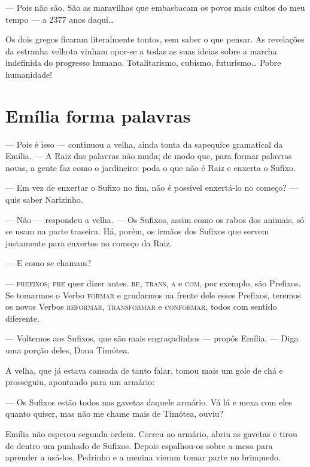 --- Pois não são. São as maravilhas que embasbacam os povos mais cultos
do meu tempo --- a 2377 anos daqui\ldots{}

Os dois gregos ficaram literalmente tontos, sem saber o que pensar. As
revelações da estranha velhota vinham opor-se a todas as suas ideias
sobre a marcha indefinida do progresso humano. Totalitarismo, cubismo,
futurismo\ldots{} Pobre humanidade!


\chapter{Emília forma palavras}

--- Pois é isso --- continuou a velha, ainda tonta da sapequice
gramatical da Emília. --- A Raiz das palavras não muda; de modo que,
para formar palavras novas, a gente faz como o jardineiro: poda o que
não é Raiz e enxerta o Sufixo.

--- Em vez de enxertar o Sufixo no fim, não é possível enxertá-lo no
começo? --- quis saber Narizinho.

--- Não --- respondeu a velha. --- Os Sufixos, assim como os rabos dos
animais, só se usam na parte traseira. Há, porém, os irmãos dos Sufixos
que servem justamente para enxertos no começo da Raiz.

--- E como se chamam?

--- \textsc{prefixos}; \textsc{pre} quer dizer antes. \textsc{re}, \textsc{trans}, \textsc{a} e \textsc{com}, por exemplo, são
Prefixos. Se tomarmos o Verbo \textsc{formar} e grudarmos na frente dele esses
Prefixos, teremos os novos Verbos \textsc{reformar}, \textsc{transformar} e \textsc{conformar},
todos com sentido diferente.

--- Voltemos aos Sufixos, que são mais engraçadinhos --- propôs Emília.
--- Diga uma porção deles, Dona Timótea.

A velha, que já estava cansada de tanto falar, tomou mais um gole de chá
e prosseguiu, apontando para um armário:

--- Os Sufixos estão todos nas gavetas daquele armário. Vá lá e mexa com
eles quanto quiser, mas não me chame mais de Timótea, ouviu?

Emília não esperou segunda ordem. Correu ao armário, abriu as gavetas e
tirou de dentro um punhado de Sufixos. Depois espalhou-os sobre a mesa
para aprender a usá-los. Pedrinho e a menina vieram tomar parte no
brinquedo.

